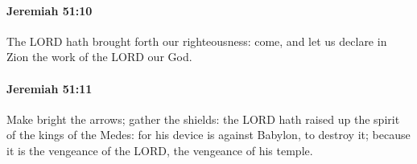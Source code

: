		\paragraph{Jeremiah 51:10} %
			\label{JEREMIAH-51-10}

			The LORD hath brought forth our righteousness: come, and let us declare in Zion the work of the LORD our God.


		\paragraph{Jeremiah 51:11} %
			\label{JEREMIAH-51-11}

			Make bright the arrows; gather the shields: the LORD hath raised up the spirit of the kings of the Medes: for his device is against Babylon, to destroy it; because it is the vengeance of the LORD, the vengeance of his temple.


